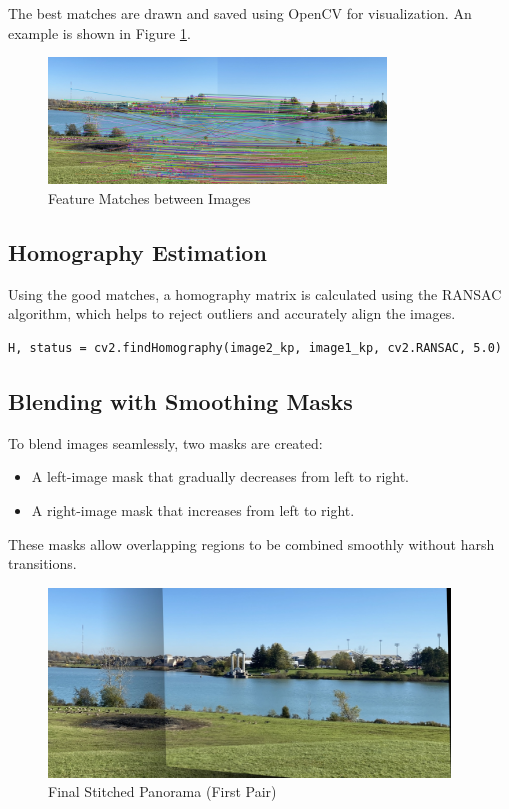 \documentclass[12pt]{article}
\begin{document}
The best matches are drawn and saved using OpenCV for visualization. An example is shown in Figure \ref{fig:matches}.

\begin{figure}[H]
    \centering
    \includegraphics[width=0.8\textwidth]{matching1.jpg}
    \caption{Feature Matches between Images}
    \label{fig:matches}
\end{figure}

\subsection{Homography Estimation}
Using the good matches, a homography matrix is calculated using the RANSAC algorithm, which helps to reject outliers and accurately align the images.

\begin{verbatim}
H, status = cv2.findHomography(image2_kp, image1_kp, cv2.RANSAC, 5.0)
\end{verbatim}

\subsection{Blending with Smoothing Masks}
To blend images seamlessly, two masks are created:
\begin{itemize}
    \item A left-image mask that gradually decreases from left to right.
    \item A right-image mask that increases from left to right.
\end{itemize}

These masks allow overlapping regions to be combined smoothly without harsh transitions.

\begin{figure}[H]
    \centering
    \includegraphics[width=0.95\textwidth]{panorama 1.jpg}
    \caption{Final Stitched Panorama (First Pair)}
\end{figure}
\end{document}
